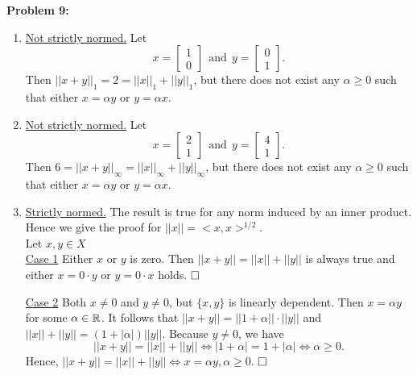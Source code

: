 \documentclass[letterpaper]{article}
\begin{document}
\noindent \textbf{Problem  9:}
\begin{enumerate}
\setlength{\itemsep}{.1in}
\renewcommand{\labelenumi}{(\alph{enumi})}
\item \underline{Not strictly normed.} Let
$$x = \begin{bmatrix} 1 \\ 0 \end{bmatrix} ~~ \text{and} ~~ y = \begin{bmatrix} 0 \\ 1 \end{bmatrix}.$$
Then $||x+y||_1 = 2 = ||x||_1 + ||y||_1$, but there does not exist any $\alpha \geq 0$ such that either $x = \alpha y$ or $y = \alpha x$.

\item[(c)] \underline{Not strictly normed.} Let
$$x = \begin{bmatrix} 2 \\ 1 \end{bmatrix} ~~ \text{and} ~~ y = \begin{bmatrix} 4 \\ 1 \end{bmatrix}.$$
Then $6 = ||x+y||_\infty = ||x||_\infty + ||y||_\infty$, but there does not exist any $\alpha \geq 0$ such that either $x = \alpha y$ or $y = \alpha x$.

\item[(b)] \underline{Strictly normed.} The result is true for any norm induced by an inner product. Hence we give the proof for $||x|| = <x, x>^{1/2}.$
\medskip \\
Let $x, y \in X$
\medskip \\
\underline{Case 1} Either $x$ or $y$ is zero. Then $||x+y|| = ||x||+||y||$ is always true and either $x = 0\cdot y$ or $y = 0 \cdot x$ holds. $\hfill \square$

\underline{Case 2} Both $x \neq 0$ and $y \neq 0$, but $\{x, y\}$ is linearly dependent. Then $x = \alpha y$ for some $\alpha \in \mathbb R$. It follows that $||x+y|| = ||1+\alpha||\cdot||y||$ and $||x||+||y|| = (1+|\alpha|)||y||$. Because $y \neq 0$, we have
$$||x+y|| = ||x||+||y|| \iff |1+\alpha| = 1+|\alpha| \iff \alpha \geq 0.$$
Hence, $||x+y|| = ||x||+||y|| \iff x = \alpha y, \alpha \geq 0$.
$\hfill \square$


\end{enumerate}
\end{document}
